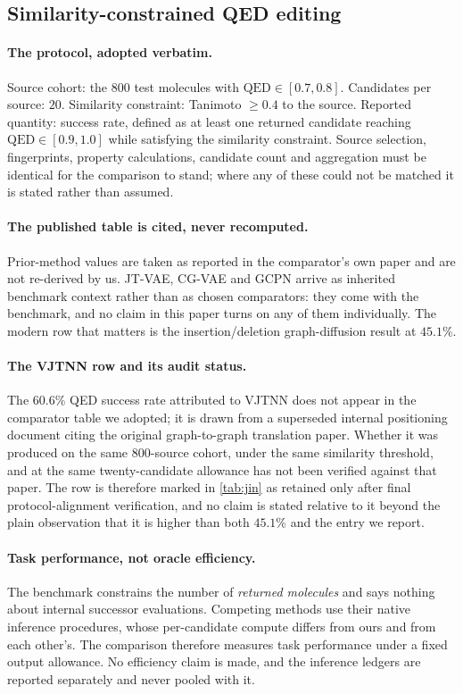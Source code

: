 \subsection{Similarity-constrained {QED} editing}

\paragraph{The protocol, adopted verbatim.}
Source cohort: the $800$ test molecules with $\mathrm{QED}\in[0.7,0.8]$. Candidates per source: $20$. Similarity constraint: Tanimoto $\ge 0.4$ to the source. Reported quantity: success rate, defined as at least one returned candidate reaching $\mathrm{QED}\in[0.9,1.0]$ while satisfying the similarity constraint. Source selection, fingerprints, property calculations, candidate count and aggregation must be identical for the comparison to stand; where any of these could not be matched it is stated rather than assumed.

\paragraph{The published table is cited, never recomputed.}
Prior-method values are taken as reported in the comparator's own paper and are not re-derived by us. JT-VAE, CG-VAE and GCPN arrive as inherited benchmark context rather than as chosen comparators: they come with the benchmark, and no claim in this paper turns on any of them individually. The modern row that matters is the insertion/deletion graph-diffusion result at $45.1\%$.

\paragraph{The {VJTNN} row and its audit status.}
The $60.6\%$ QED success rate attributed to VJTNN does not appear in the comparator table we adopted; it is drawn from a superseded internal positioning document citing the original graph-to-graph translation paper. Whether it was produced on the same $800$-source cohort, under the same similarity threshold, and at the same twenty-candidate allowance has not been verified against that paper. The row is therefore marked in \cref{tab:jin} as retained only after final protocol-alignment verification, and no \method{} claim is stated relative to it beyond the plain observation that it is higher than both $45.1\%$ and the entry we report.

\paragraph{Task performance, not oracle efficiency.}
The benchmark constrains the number of \emph{returned molecules} and says nothing about internal successor evaluations. Competing methods use their native inference procedures, whose per-candidate compute differs from ours and from each other's. The comparison therefore measures task performance under a fixed output allowance. No efficiency claim is made, and the inference ledgers are reported separately and never pooled with it.

